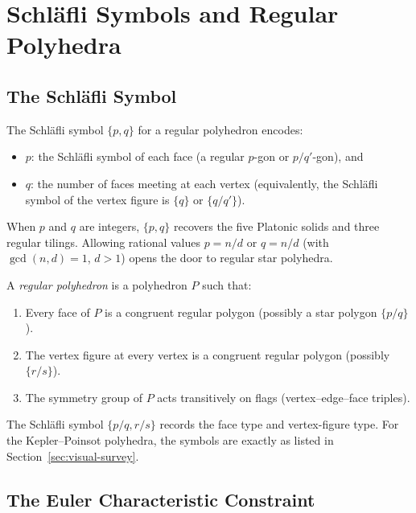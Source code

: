 \section{Schläfli Symbols and Regular Polyhedra}
\label{sec:schlafli}

\subsection{The Schläfli Symbol}
\label{ssec:schlafli-symbol}

The Schläfli symbol \(\{p,q\}\) for a regular polyhedron
encodes:
\begin{itemize}
  \item \(p\): the Schläfli symbol of each face (a regular
        \(p\)-gon or \(p/q'\)-gon), and
  \item \(q\): the number of faces meeting at each vertex
        (equivalently, the Schläfli symbol of the vertex
        figure is \(\{q\}\) or \(\{q/q'\}\)).
\end{itemize}
When $p$ and $q$ are integers, \(\{p,q\}\) recovers the five
Platonic solids and three regular tilings.  Allowing rational
values \(p = n/d\) or \(q = n/d\) (with $\gcd(n,d)=1$,
$d>1$) opens the door to regular star polyhedra.

\begin{definition}
\label{def:regular-polyhedron}
A \emph{regular polyhedron} is a polyhedron \(P\) such that:
\begin{enumerate}
  \item Every face of \(P\) is a congruent regular polygon
        (possibly a star polygon \(\{p/q\}\)).
  \item The vertex figure at every vertex is a congruent
        regular polygon (possibly \(\{r/s\}\)).
  \item The symmetry group of \(P\) acts transitively on
        flags (vertex–edge–face triples).
\end{enumerate}
\end{definition}

The Schläfli symbol \(\{p/q, r/s\}\) records the face type and
vertex-figure type.  For the Kepler–Poinsot polyhedra, the
symbols are exactly as listed in Section~\ref{sec:visual-survey}.

\subsection{The Euler Characteristic Constraint}
\label{ssec:euler}

